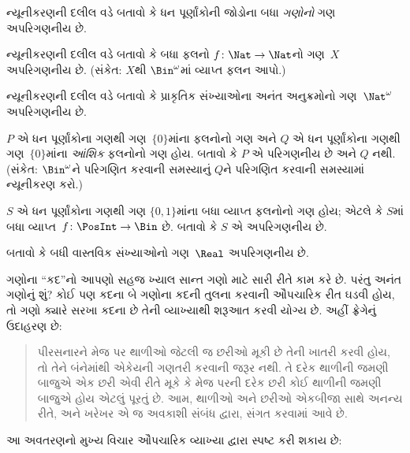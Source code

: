 \begin{prob}
ન્યૂનીકરણની દલીલ વડે બતાવો કે ધન પૂર્ણાંકોની જોડોના બધા
\emph{ગણોનો} ગણ અપરિગણનીય છે.
\end{prob}

\begin{prob}\label{sfr:siz:red:prob:nat-nat}
  ન્યૂનીકરણની દલીલ વડે બતાવો કે બધા ફલનો
  $f\colon \Nat \to \Nat$નો ગણ~$X$ અપરિગણનીય છે.
  (સંકેત: $X$થી $\Bin^\omega$માં વ્યાપ્ત ફલન આપો.)
\end{prob}

\begin{prob}
ન્યૂનીકરણની દલીલ વડે બતાવો કે પ્રાકૃતિક સંખ્યાઓના અનંત
અનુક્રમોનો ગણ~$\Nat^\omega$ અપરિગણનીય છે.
\end{prob}

\begin{prob}
$P$ એ ધન પૂર્ણાંકોના ગણથી ગણ~$\{0\}$માંના ફલનોનો ગણ અને
$Q$ એ ધન પૂર્ણાંકોના ગણથી ગણ~$\{0\}$માંના \emph{આંશિક}
ફલનોનો ગણ હોય. બતાવો કે $P$ એ પરિગણનીય છે અને $Q$ નથી.
(સંકેત: $\Bin^\omega$ને પરિગણિત કરવાની સમસ્યાનું $Q$ને
પરિગણિત કરવાની સમસ્યામાં ન્યૂનીકરણ કરો.)
\end{prob}

\begin{prob}
$S$ એ ધન પૂર્ણાંકોના ગણથી ગણ $\{0,1\}$માંના બધા
વ્યાપ્ત ફલનોનો ગણ હોય; એટલે કે $S$માં બધા
વ્યાપ્ત~$f\colon \PosInt \to \Bin$ છે. બતાવો કે $S$ એ
અપરિગણનીય છે.
\end{prob}

\begin{prob}
બતાવો કે બધી વાસ્તવિક સંખ્યાઓનો ગણ~$\Real$ અપરિગણનીય છે.
\end{prob}
\endgroup


\begingroup
\makeatletter{}\makeatother


\label{guunit:OLP-0035}


ગણોના ``કદ''નો આપણો સહજ ખ્યાલ સાન્ત ગણો માટે સારી રીતે
કામ કરે છે. પરંતુ અનંત ગણોનું શું? કોઈ પણ કદના બે ગણોના કદની
તુલના કરવાની ઔપચારિક રીત ઘડવી હોય, તો ગણો ક્યારે સરખા કદના છે
તેની વ્યાખ્યાથી શરૂઆત કરવી યોગ્ય છે. અહીં ફ્રેગેનું ઉદાહરણ છે:
\begin{quote}
  પીરસનારને મેજ પર થાળીઓ જેટલી જ છરીઓ મૂકી છે તેની ખાતરી કરવી
  હોય, તો તેને બંનેમાંથી એકેયની ગણતરી કરવાની જરૂર નથી. તે દરેક
  થાળીની જમણી બાજુએ એક છરી એવી રીતે મૂકે કે મેજ પરની દરેક છરી
  કોઈ થાળીની જમણી બાજુએ હોય એટલું પૂરતું છે. આમ, થાળીઓ અને
  છરીઓ એકબીજા સાથે અનન્ય રીતે, અને ખરેખર એ જ અવકાશી સંબંધ
  દ્વારા, સંગત કરવામાં આવે છે. \citep[\S70]{Frege1884}
\end{quote}
આ અવતરણનો મુખ્ય વિચાર ઔપચારિક વ્યાખ્યા દ્વારા સ્પષ્ટ કરી શકાય છે:


